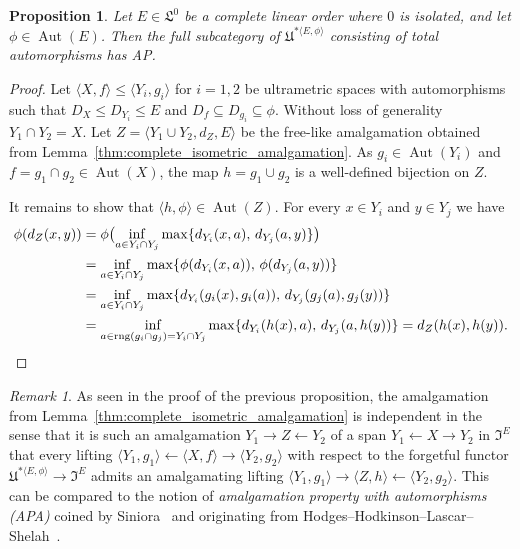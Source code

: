 \documentclass[oneside,notitlepage,12pt]{article}
\newtheorem{prop}[tw]{Proposition}
\theoremstyle{definition}
\theoremstyle{remark}
\newtheorem{uwgi}[tw]{Remark}
\newcommand \set [1]{\{#1\}}
\newcommand \seq [1]{\langle #1 \rangle}
\newcommand \from {\leftarrow}
\newcommand \rng {\operatorname{rng}}
\newcommand \Lin {\mathfrak{L}}
\newcommand \Ult {\mathfrak{U}}
\newcommand \UltIso {\mathfrak{I}}
\newcommand \Aut {\operatorname{Aut}}
\let \aut \Aut
\begin{document}
\begin{prop} \label{thm:iso_auto_amalgamation}
    Let $E \in \Lin^0$ be a complete linear order where $0$ is isolated, and let $\phi \in \aut(E)$.
    Then the full subcategory of $\Ult^{*\seq{E, \phi}}$ consisting of total automorphisms has AP.
\end{prop}
\begin{proof}
    Let $\seq{X, f} \leq \seq{Y_i, g_i}$ for $i = 1, 2$ be ultrametric spaces with automorphisms such that $D_X \leq D_{Y_i} \leq E$ and $D_f \subseteq D_{g_i} \subseteq \phi$.
    Without loss of generality $Y_1 \cap Y_2 = X$.
    Let $Z = \seq{Y_1 \cup Y_2, d_Z, E}$ be the free-like amalgamation obtained from Lemma~\ref{thm:complete_isometric_amalgamation}.
    As $g_i \in \aut(Y_i)$ and $f = g_1 \cap g_2 \in \aut(X)$, the map $h = g_1 \cup g_2$ is a well-defined bijection on $Z$.

    It remains to show that $\seq{h, \phi} \in \aut(Z)$.
    For every $x \in Y_i$ and $y \in Y_j$ we have
    \begin{align*}
        \phi(d_Z(x, y)) &= \phi\bigl(\inf_{a \in Y_i \cap Y_j} \max\set{d_{Y_i}(x, a),\, d_{Y_j}(a, y)}\bigr) \\
        &= \inf_{a \in Y_i \cap Y_j} \max\set{\phi(d_{Y_i}(x, a)),\, \phi(d_{Y_j}(a, y))} \\
        &= \inf_{a \in Y_i \cap Y_j} \max\set{d_{Y_i}(g_i(x), g_i(a)),\, d_{Y_j}(g_j(a), g_j(y))} \\
        &= \inf_{a \in \rng(g_i \cap g_j) = Y_i \cap Y_j} \max\set{d_{Y_i}(h(x), a),\, d_{Y_j}(a, h(y))} 
        = d_Z(h(x), h(y)).
        \qedhere
    \end{align*}
\end{proof}

\begin{uwgi} \label{rmk:independent_amalgamation}
    As seen in the proof of the previous proposition, the amalgamation from Lemma~\ref{thm:complete_isometric_amalgamation} is independent in the sense that it is such an amalgamation $Y_1 \to Z \from Y_2$ of a span $Y_1 \from X \to Y_2$ in $\UltIso^E$ that every lifting $\seq{Y_1, g_1} \from \seq{X, f} \to \seq {Y_2, g_2}$ with respect to the forgetful functor $\Ult^{*\seq{E, \phi}} \to \UltIso^E$ admits an amalgamating lifting $\seq{Y_1, g_1} \to \seq{Z, h} \from \seq{Y_2, g_2}$.
    This can be compared to the notion of \emph{amalgamation property with automorphisms (APA)} coined by Siniora~\cite{Siniora} and originating from Hodges–Hodkinson–Lascar–Shelah~\cite{HHLS}.
\end{uwgi}
\end{document}
